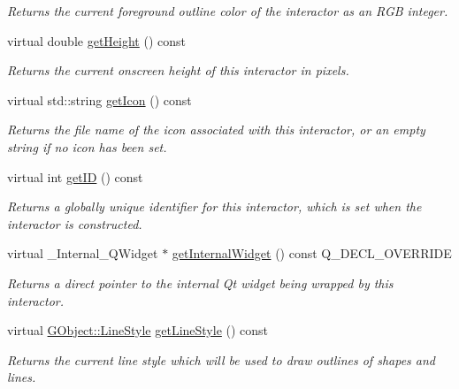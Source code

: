 \begin{DoxyCompactItemize}
\begin{DoxyCompactList}\small\item\em Returns the current foreground outline color of the interactor as an R\+GB integer. \end{DoxyCompactList}\item 
virtual double \mbox{\hyperlink{classGInteractor_a1e7e353362434072875264cf95629f99}{get\+Height}} () const
\begin{DoxyCompactList}\small\item\em Returns the current onscreen height of this interactor in pixels. \end{DoxyCompactList}\item 
virtual std\+::string \mbox{\hyperlink{classGInteractor_aaed62a73004939a64da6f0eb9eb64d73}{get\+Icon}} () const
\begin{DoxyCompactList}\small\item\em Returns the file name of the icon associated with this interactor, or an empty string if no icon has been set. \end{DoxyCompactList}\item 
virtual int \mbox{\hyperlink{classGInteractor_a9c9659a6c6ba66b4107ba59c95a24241}{get\+ID}} () const
\begin{DoxyCompactList}\small\item\em Returns a globally unique identifier for this interactor, which is set when the interactor is constructed. \end{DoxyCompactList}\item 
virtual \+\_\+\+Internal\+\_\+\+Q\+Widget $\ast$ \mbox{\hyperlink{classGCanvas_a208ce13c1da40bf0ddb509daf99d6588}{get\+Internal\+Widget}} () const Q\+\_\+\+D\+E\+C\+L\+\_\+\+O\+V\+E\+R\+R\+I\+DE
\begin{DoxyCompactList}\small\item\em Returns a direct pointer to the internal Qt widget being wrapped by this interactor. \end{DoxyCompactList}\item 
virtual \mbox{\hyperlink{classGObject_a86e0f5648542856159bb40775c854aa7}{G\+Object\+::\+Line\+Style}} \mbox{\hyperlink{classGDrawingSurface_aaf1f5ea8281e5e3486662878d26f0a13}{get\+Line\+Style}} () const
\begin{DoxyCompactList}\small\item\em Returns the current line style which will be used to draw outlines of shapes and lines. \end{DoxyCompactList}\item 

\end{DoxyCompactItemize}
